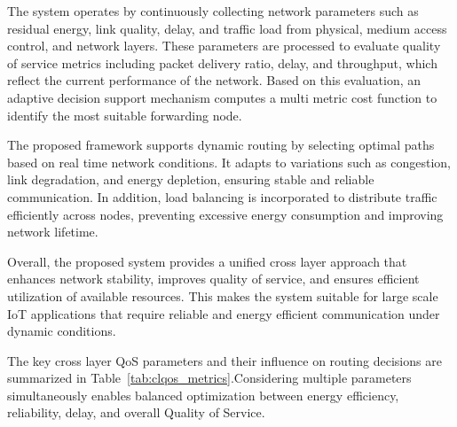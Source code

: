 \documentclass[a4paper,fleqn]{cas-dc}
\numberwithin{equation}{section}
\begin{document}
The system operates by continuously collecting network parameters such as residual energy, link quality, delay, and traffic load from physical, medium access control, and network layers. These parameters are processed to evaluate quality of service metrics including packet delivery ratio, delay, and throughput, which reflect the current performance of the network. Based on this evaluation, an adaptive decision support mechanism computes a multi metric cost function to identify the most suitable forwarding node.

The proposed framework supports dynamic routing by selecting optimal paths based on real time network conditions. It adapts to variations such as congestion, link degradation, and energy depletion, ensuring stable and reliable communication. In addition, load balancing is incorporated to distribute traffic efficiently across nodes, preventing excessive energy consumption and improving network lifetime.

Overall, the proposed system provides a unified cross layer approach that enhances network stability, improves quality of service, and ensures efficient utilization of available resources. This makes the system suitable for large scale IoT applications that require reliable and energy efficient communication under dynamic conditions.

 
 The key cross layer QoS parameters and their influence on routing decisions are summarized in Table~\ref{tab:clqos_metrics}.Considering multiple parameters simultaneously enables balanced optimization between energy efficiency, reliability, delay, and overall Quality of Service.
\end{document}
